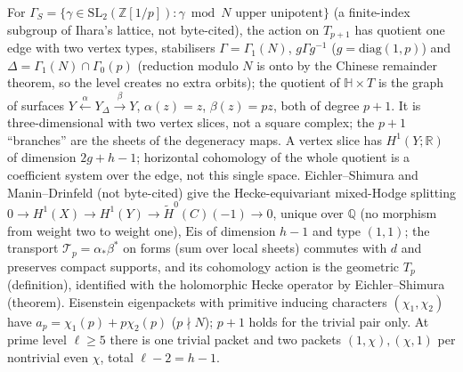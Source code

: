\begin{proposition}
\label{prop:ihara-graph-of-surfaces}
For $\Gamma_S = \{\gamma\in\mathrm{SL}_2(\mathbb Z[1/p]):\gamma\bmod N\text{ upper unipotent}\}$ (a finite-index subgroup of
Ihara's lattice, not byte-cited), the action on $T_{p+1}$ has quotient one edge with two vertex types, stabilisers
$\Gamma = \Gamma_1(N)$, $g\Gamma g^{-1}$ ($g = \mathrm{diag}(1,p)$) and $\Delta = \Gamma_1(N)\cap\Gamma_0(p)$ (reduction modulo $N$ is
onto by the Chinese remainder theorem, so the level creates no extra orbits); the quotient of $\mathbb H\times T$ is the graph
of surfaces $Y\xleftarrow{\alpha}Y_\Delta\xrightarrow{\beta}Y$, $\alpha(z) = z$, $\beta(z) = pz$, both of degree $p+1$. It is
three-dimensional with two vertex slices, not a square complex; the $p+1$ ``branches'' are the sheets of the degeneracy maps.
A vertex slice has $H^1(Y;\mathbb R)$ of dimension $2g+h-1$; horizontal cohomology of the whole quotient is a coefficient
system over the edge, not this single space. Eichler--Shimura and Manin--Drinfeld (not byte-cited) give the
Hecke-equivariant mixed-Hodge splitting $0\to H^1(X)\to H^1(Y)\to\tilde H^0(C)(-1)\to0$, unique over $\mathbb Q$ (no morphism
from weight two to weight one), $\mathrm{Eis}$ of dimension $h-1$ and type $(1,1)$; the transport
$\mathcal T_p = \alpha_{*}\beta^{*}$ on forms (sum over local sheets) commutes with $d$ and preserves compact supports, and its
cohomology action is the geometric $T_p$ (definition), identified with the holomorphic Hecke operator by
Eichler--Shimura (theorem). Eisenstein eigenpackets with primitive inducing characters $(\chi_1,\chi_2)$ have
$a_p = \chi_1(p)+p\chi_2(p)$ ($p\nmid N$); $p+1$ holds for the trivial pair only. At prime level $\ell\ge5$ there is one trivial
packet and two packets $(1,\chi),(\chi,1)$ per nontrivial even $\chi$, total $\ell-2 = h-1$.
\end{proposition}

